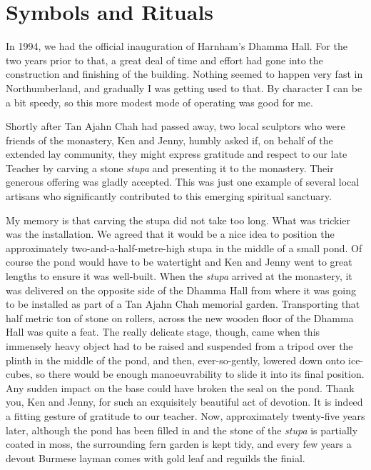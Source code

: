 \chapter{Symbols and Rituals}

In 1994, we had the official inauguration of Harnham's Dhamma Hall. For
the two years prior to that, a great deal of time and effort had gone
into the construction and finishing of the building. Nothing seemed to
happen very fast in Northumberland, and gradually I was getting used to
that. By character I can be a bit speedy, so this more modest mode of
operating was good for me.

Shortly after Tan Ajahn Chah had passed away, two local sculptors who
were friends of the monastery, Ken and Jenny, humbly asked if, on behalf
of the extended lay community, they might express gratitude and respect
to our late Teacher by carving a stone \emph{stupa} and presenting it to
the monastery. Their generous offering was gladly accepted. This was
just one example of several local artisans who significantly contributed
to this emerging spiritual sanctuary.

\enlargethispage{\baselineskip}

My memory is that carving the stupa did not take too long. What was
trickier was the installation. We agreed that it would be a nice idea to
position the approximately two-and-a-half-metre-high stupa in the middle
of a small pond. Of course the pond would have to be watertight and Ken
and Jenny went to great lengths to ensure it was well-built. When the
\emph{stupa} arrived at the monastery, it was delivered on the opposite
side of the Dhamma Hall from where it was going to be installed as part
of a Tan Ajahn Chah memorial garden. Transporting that half metric ton
of stone on rollers, across the new wooden floor of the Dhamma Hall was
quite a feat. The really delicate stage, though, came when this
immensely heavy object had to be raised and suspended from a tripod over
the plinth in the middle of the pond, and then, ever-so-gently, lowered
down onto ice-cubes, so there would be enough manoeuvrability to slide
it into its final position. Any sudden impact on the base could have
broken the seal on the pond. Thank you, Ken and Jenny, for such an
exquisitely beautiful act of devotion. It is indeed a fitting gesture of
gratitude to our teacher. Now, approximately twenty-five years later,
although the pond has been filled in and the stone of the \emph{stupa}
is partially coated in moss, the surrounding fern garden is kept tidy,
and every few years a devout Burmese layman comes with gold leaf and
reguilds the finial.

